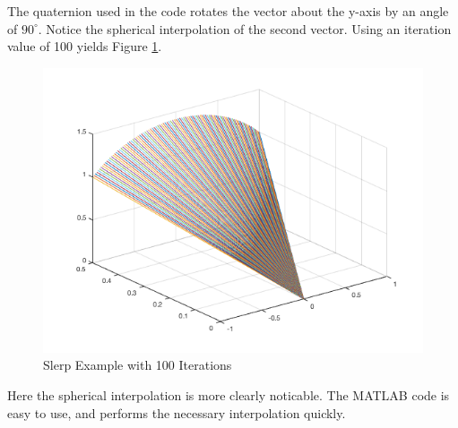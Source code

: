 The quaternion used in the code rotates the vector about the y-axis by an angle of $90^\circ$.
Notice the spherical interpolation of the second vector.
Using an iteration value of 100 yields Figure \ref{fig:slerp100}.


\begin{figure}[H]
\centering
\includegraphics[width = .75\textwidth]{Figures/slerp100.png}
\caption{Slerp Example with 100 Iterations}
\label{fig:slerp100}
\end{figure}

Here the spherical interpolation is more clearly noticable.
The MATLAB code is easy to use, and performs the necessary interpolation quickly.
